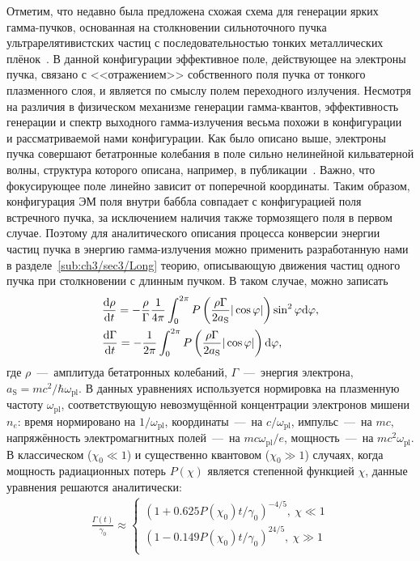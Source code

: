 Отметим, что недавно была предложена схожая схема для генерации ярких гамма-пучков, основанная на столкновении сильноточного пучка ультрарелятивистских частиц с последовательностью тонких металлических плёнок~\cite{sampath2021extremely}. 
В данной конфигурации эффективное поле, действующее на электроны пучка, связано с <<отражением>> собственного поля пучка от тонкого плазменного слоя, и является по смыслу полем переходного излучения.
Несмотря на различия в физическом механизме генерации гамма-квантов, эффективность генерации и спектр выходного гамма-излучения весьма похожи в конфигурации~\cite{sampath2021extremely} и рассматриваемой нами конфигурации.
Как было описано выше, электроны пучка совершают бетатронные колебания в поле сильно нелинейной кильватерной волны, структура которого описана, например, в публикации~\cite{kostyukov2004phenomenological}.
Важно, что фокусирующее поле линейно зависит от поперечной координаты.
Таким образом, конфигурация ЭМ поля внутри баббла совпадает с конфигурацией поля встречного пучка, за исключением наличия также тормозящего поля в первом случае.
Поэтому для аналитического описания процесса конверсии энергии частиц пучка в энергию гамма-излучения можно применить разработанную нами в разделе~\ref{sub:ch3/sec3/Long} теорию, описывающую движения частиц одного пучка при столкновении с длинным пучком.
В таком случае, можно записать
\begin{align}
    \label{eq:ch3/sec3/dydt}
    &\dv{\rho}{t} = -\frac{\rho}{\Gamma}\frac{1}{4\pi}\int_0^{2\pi}P\left(\frac{\rho\Gamma }{2a_\mathrm{S}} | \cos\varphi |\right)\sin^2\varphi \dd\varphi ,\\
    \label{eq:ch3/sec3/dgdt}
    &\dv{\Gamma}{t} = -\frac{1}{2\pi}\int_0^{2\pi}P\left(\frac{\rho \Gamma }{2a_\mathrm{S}} | \cos\varphi |\right) \dd\varphi,
\end{align}
где $\rho$~---~амплитуда бетатронных колебаний, $\Gamma$~---~энергия электрона, $a_\mathrm{S} = mc^2/\hbar\omega_\mathrm{pl}$.
В данных уравнениях используется нормировка на плазменную частоту $\omega_\mathrm{pl}$, соответствующую невозмущённой концентрации электронов мишени $n_e$: время нормировано на $ 1/\omega_\mathrm{pl}$, координаты~---~на $c/\omega_\mathrm{pl}$, импульс~---~на $mc$, напряжённость электромагнитных полей~---~на $mc\omega_\mathrm{pl}/e$, мощность~---~на $mc^2\omega_\mathrm{pl}$.
В классическом ($\chi_0 \ll 1$) и существенно квантовом ($\chi_0 \gg 1$) случаях, когда мощность радиационных потерь $P(\chi)$ является степенной функцией $\chi$, данные уравнения решаются аналитически:
\begin{align}
    \label{eq:ch3/sec3/gamma}
    \frac{ \Gamma(t) }{\gamma_0} \approx 
    \begin{cases}
        {\left(1 + 0.625 P(\chi_0) t / \gamma_0 \right)}^{-4/5},\ \chi\ll 1 \\
        {\left(1 - 0.149 P(\chi_0) t / \gamma_0 \right)}^{24/5},\ \chi\gg 1 \\
    \end{cases}
\end{align}
